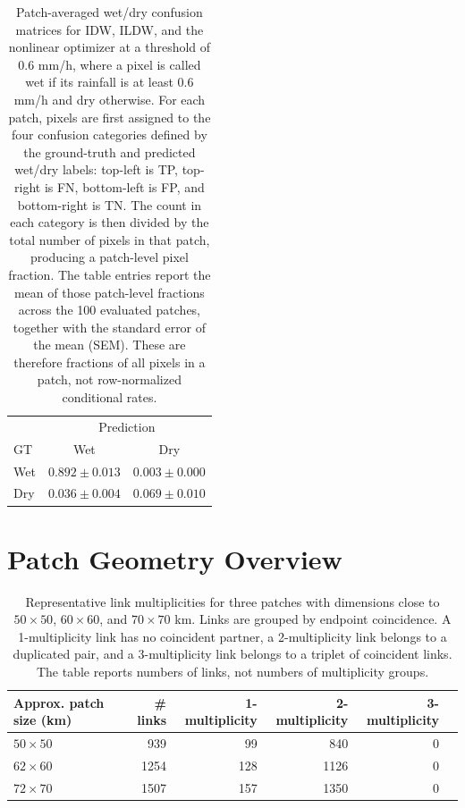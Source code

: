 \documentclass[11pt]{article}
\begin{document}
\begin{table}[H]
\begin{minipage}[t]{0.31\textwidth}
    \vspace{0.35em}
    \scriptsize
    \begin{tabular}{lcc}
      \toprule
       & \multicolumn{2}{c}{Prediction} \\
      GT & Wet & Dry \\
      \midrule
      Wet & $0.892 \pm 0.013$ & $0.003 \pm 0.000$ \\
      Dry & $0.036 \pm 0.004$ & $0.069 \pm 0.010$ \\
      \bottomrule
    \end{tabular}
  \end{minipage}
  \caption{Patch-averaged wet/dry confusion matrices for IDW, ILDW, and the nonlinear optimizer at a threshold of $0.6$ mm/h, where a pixel is called wet if its rainfall is at least $0.6$ mm/h and dry otherwise. For each patch, pixels are first assigned to the four confusion categories defined by the ground-truth and predicted wet/dry labels: top-left is TP, top-right is FN, bottom-left is FP, and bottom-right is TN. The count in each category is then divided by the total number of pixels in that patch, producing a patch-level pixel fraction. The table entries report the mean of those patch-level fractions across the 100 evaluated patches, together with the standard error of the mean (SEM). These are therefore fractions of all pixels in a patch, not row-normalized conditional rates.}
\end{table}

\section*{Patch Geometry Overview}
\begin{table}[H]
  \centering
  \begin{tabular}{lrrrrr}
    \toprule
    Approx. patch size (km) & \# links & 1-multiplicity & 2-multiplicity & 3-multiplicity \\
    \midrule
    $50 \times 50$ & 939 & 99 & 840 & 0 \\
    $62 \times 60$ & 1254 & 128 & 1126 & 0 \\
    $72 \times 70$ & 1507 & 157 & 1350 & 0 \\
    \bottomrule
  \end{tabular}
  \caption{Representative link multiplicities for three patches with dimensions close to $50\times 50$, $60\times 60$, and $70\times 70$ km. Links are grouped by endpoint coincidence. A 1-multiplicity link has no coincident partner, a 2-multiplicity link belongs to a duplicated pair, and a 3-multiplicity link belongs to a triplet of coincident links. The table reports numbers of links, not numbers of multiplicity groups.}
\end{table}
\end{document}
